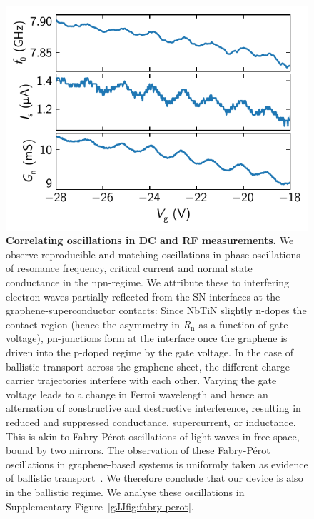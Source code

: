 \begin{figure}[]
	\centering
	\includegraphics[width=.6\linewidth]{chapter-gJJ/figs/si_corr_osc}
	\caption{\textbf{Correlating oscillations in DC and RF measurements.}
		We observe reproducible and matching oscillations in-phase oscillations of resonance frequency, critical current and normal state conductance in the npn-regime.
		We attribute these to interfering electron waves partially reflected from the SN interfaces at the graphene-superconductor contacts:
		Since NbTiN slightly n-dopes the contact region (hence the asymmetry in $R_\text{n}$ as a function of gate voltage), pn-junctions form at the interface once the graphene is driven into the p-doped regime by the gate voltage.
		In the case of ballistic transport across the graphene sheet, the different charge carrier trajectories interfere with each other.
		Varying the gate voltage leads to a change in Fermi wavelength and hence an alternation of constructive and destructive interference, resulting in reduced and suppressed conductance, supercurrent, or inductance.
		This is akin to Fabry-P\'erot oscillations of light waves in free space, bound by two mirrors.
		The observation of these Fabry-P\'erot oscillations in graphene-based systems is uniformly taken as evidence of ballistic transport~\cite{liangFabryPerotInterference2001,miaoPhaseCoherentTransportGraphene2007,youngQuantumInterferenceKlein2009,choMasslessMassiveParticleinabox2011,wuQuantumBehaviorGraphene2012,camposQuantumClassicalConfinement2012,rickhausBallisticInterferencesSuspended2013,benshalomQuantumOscillationsCritical2015,caladoBallisticJosephsonJunctions2015d,ametSupercurrentQuantumHall2016b,borzenetsBallisticGrapheneJosephson2016a,allenObservationElectronCoherence2017,zhuSupercurrentMultipleAndreev2018}.
		We therefore conclude that our device is also in the ballistic regime.
		We analyse these oscillations in Supplementary Figure~\ref{gJJfig:fabry-perot}.
	} 
	\label{gJJfig:quantum_osc}
\end{figure}

